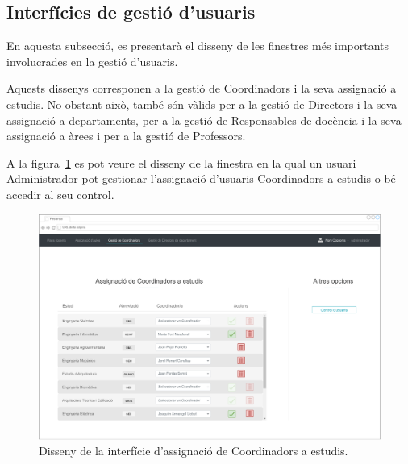 \documentclass[a4paper,12pt]{ThesisStyle}
\begin{document}
\subsection{Interfícies de gestió d'usuaris}
\label{subsec:interficies_gestio_usuaris}

En aquesta subsecció, es presentarà el disseny de les finestres més importants involucrades en la gestió d'usuaris.

Aquests dissenys corresponen a la gestió de Coordinadors i la seva assignació a estudis. No obstant això, també són vàlids per a la gestió de Directors i la seva assignació a departaments, per a la gestió de Responsables de docència i la seva assignació a àrees i per a la gestió de Professors.

A la figura~\ref{img:usuaris_assignacio} es pot veure el disseny de la finestra en la qual un usuari Administrador pot gestionar l'assignació d'usuaris Coordinadors a estudis o bé accedir al seu control.

\begin{figure}[H]
	\centering
	\includegraphics[width=\textwidth]{assets/interfaces/usuaris/assignacio.pdf}
	\caption{\label{img:usuaris_assignacio}Disseny de la interfície d'assignació de Coordinadors a estudis.}
\end{figure}
\end{document}
